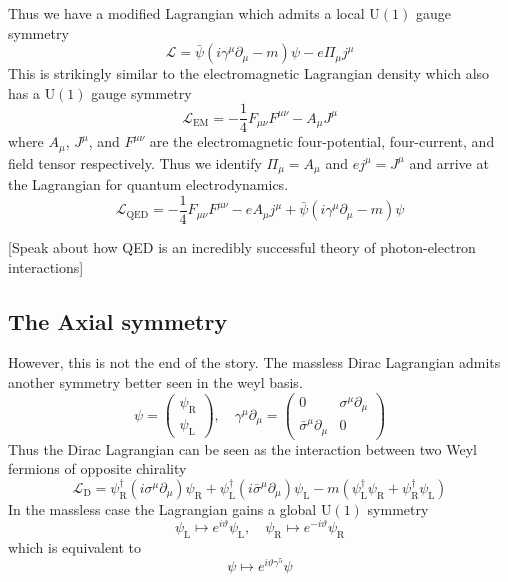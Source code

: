 \documentclass[11pt, a4paper]{article}
\theoremstyle{definition}
\theoremstyle{plain}
\begin{document}
Thus we have a modified Lagrangian which admits a local $\mathrm{U}(1)$ gauge symmetry
\begin{equation}
  \mathcal{L} =  \bar{\psi}(i \gamma^\mu\partial_\mu - m)\psi -e\Pi_\mu j^\mu
\end{equation}
This is strikingly similar to the electromagnetic Lagrangian density which
also has a $\mathrm{U}(1)$ gauge symmetry
\begin{equation}
  \mathcal{L}_\mathrm{EM} = -\frac{1}{4}F_{\mu\nu}F^{\mu\nu} -A_\mu J^\mu
\end{equation}
where $A_\mu$, $J^\mu$, and $F^{\mu\nu}$ are the electromagnetic four-potential, four-current,
and field tensor respectively. Thus we identify $\Pi_\mu = A_\mu$ and $ej^\mu = J^\mu$
and arrive at the Lagrangian for quantum electrodynamics.
\begin{equation}
  \mathcal{L}_\mathrm{QED} = -\frac{1}{4}F_{\mu\nu}F^{\mu\nu} -eA_\mu j^\mu
    + \bar{\psi}(i \gamma^\mu\partial_\mu - m)\psi
\end{equation}

[Speak about how QED is an incredibly successful theory of photon-electron interactions]


\subsection{The Axial symmetry}

However, this is not the end of the story. The massless Dirac Lagrangian admits
another symmetry better seen in the weyl basis.
\begin{equation}
  \psi =
  \begin{pmatrix} \psi_\mathrm{R} \\ \psi_\mathrm{L} \end{pmatrix}, \quad
  \gamma^{\mu}\partial_\mu =
  \begin{pmatrix}0 & \sigma^\mu\partial_\mu \\ \bar{\sigma}^{\mu}\partial_\mu & 0 \end{pmatrix}
\end{equation}
Thus the Dirac Lagrangian can be seen as the interaction between two Weyl fermions
of opposite chirality
\begin{equation}
  \mathcal{L}_\mathrm{D} = \psi_\mathrm{R}^{\dagger}(i\sigma^\mu\partial_\mu)\psi_\mathrm{R} +
  \psi_\mathrm{L}^{\dagger}(i\bar{\sigma}^\mu\partial_\mu)\psi_\mathrm{L}
  - m(\psi_\mathrm{L}^{\dagger}\psi_\mathrm{R} + \psi_\mathrm{R}^{\dagger}\psi_\mathrm{L})
\end{equation}
In the massless case the Lagrangian gains a global $\mathrm{U}(1)$ symmetry
\begin{equation}
  \psi_\mathrm{L} \mapsto e^{i\vartheta}\psi_\mathrm{L}, \quad
  \psi_\mathrm{R} \mapsto e^{-i\vartheta}\psi_\mathrm{R}
\end{equation}
which is equivalent to 
\begin{equation}
  \psi \mapsto e^{i\vartheta\gamma^5}\psi
\end{equation}
\end{document}
